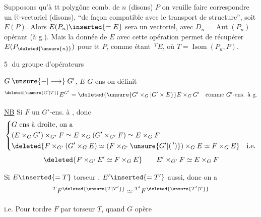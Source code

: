 Supposons qu'à tt polygône comb. de  $n$ (disons) $P$ on veuille faire correspondre un $\mathbb{R}$-vectoriel  (disons), ``de façon compatible avec le transport de structure'',  soit $E(P)$. Alors $E(P_n)\inserted{=E}$ sera un vectoriel, avec $D_n=\operatorname{Aut}(P_n)$ opérant (à g.). Mais la donnée de $E$ avec cette opération permet de récupérer $E(P_{\deleted{\unsure{n}}})$ pour tt $P$, comme étant  $\,{}^TE$, où $T=\operatorname{Isom}(P_n,P)$.

\textcircled{5}  du groupe d'opérateurs

$G\mathrel{\unsure{-|\longrightarrow}}G'$, $E$ $G$-ens \unsure{,} on définit
\[
 {}^{\deleted{\unsure{G'|T}}}E^{G'}=\deleted{\unsure{G'\times_G|G'\times E}}E\times_G G'
 \quad\text{comme $G'$-ens. à g.}
\]

\uline{NB} Si $F$ un $G'$-ens. à , donc
\[
\left\{\begin{aligned}
 &G\text{ ens à droite, on a}\\
 &(E\times_G G')\times_{G'}F\simeq E\times_G(G'\times_{G'}F)\simeq E\times_G F\\
 &\deleted{F\times_{G'}(G'\times_G E)\simeq(F\times_{G'}\unsure{G'|(\,')})\times_G E\simeq F\times_G E}\quad\text{i.e.}
\end{aligned}\right.
\]
\[
 \deleted{F\times_{G'}E'\simeq F\times_G E}\qquad E'\times_{G'}F\simeq E\times_G F
\]

Si $E\inserted{=T}$ torseur , $E'\inserted{=T'}$ aussi, donc on a
\[
 {}^{T}F^{\deleted{\unsure{T|T'}}}\simeq{}^{T'}F^{\deleted{\unsure{T'|T}}}
\]

i.e. Pour tordre $F$ par torseur $T$, quand $G$ opère
